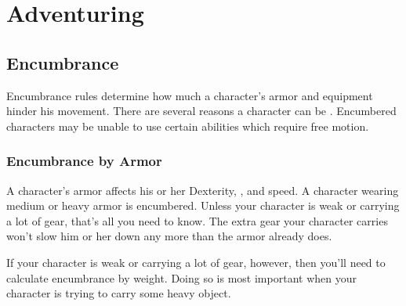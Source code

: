 \chapter{Adventuring}

\section{Encumbrance}\label{Encumbrance}
Encumbrance rules determine how much a character's armor and equipment hinder his movement. There are several reasons a character can be . Encumbered characters may be unable to use certain abilities which require free motion.

\subsection{Encumbrance by Armor}

A character's armor affects his or her Dexterity, , and speed. A character wearing medium or heavy armor is encumbered. Unless your character is weak or carrying a lot of gear, that's all you need to know. The extra gear your character carries won't slow him or her down any more than the armor already does.

If your character is weak or carrying a lot of gear, however, then you'll need to calculate encumbrance by weight. Doing so is most important when your character is trying to carry some heavy object.

